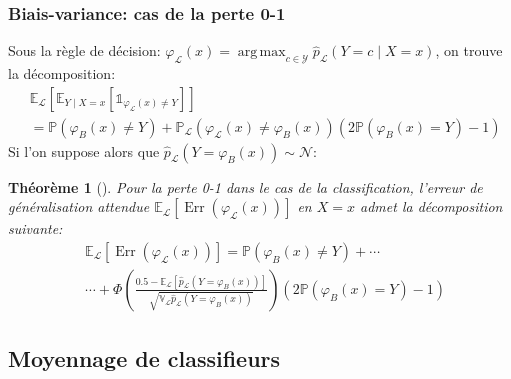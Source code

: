 \documentclass[dvipsnames,10pt]{beamer}
\DeclareMathOperator*{\argmax}{arg\,max}
\theoremstyle{plain}
\newtheorem{theoreme}{Théorème}
\theoremstyle{definition}
\begin{document}
\begin{frame}
\frametitle{Biais-variance: cas de la perte 0-1}
Sous la règle de décision: $\varphi_{\mathcal{L}} (x) = \argmax_{c \in \mathcal{Y}} \hat{p}_\mathcal{L} ( Y = c \mid X = x )$, on trouve la décomposition:
\begin{align*}
    &\mathbb{E}_{\mathcal{L}} \left[ \mathbb{E}_{Y \mid X = x} \left[ \mathds{1}_{\varphi_{\mathcal{L}} (x) \neq Y } \right]  \right] \\
    &= \mathbb{P} \left( \varphi_B (x) \neq Y \right) + \mathbb{P}_{\mathcal{L}} \left( \varphi_{\mathcal{L}} (x) \neq \varphi_B (x) \right) \left( 2 \mathbb{P} \left( \varphi_B (x) = Y \right) - 1 \right)
\end{align*}
Si l'on suppose alors que $\hat{p}_{\mathcal{L}} (Y = \varphi_B (x)) \sim \mathcal{N}$:\begin{theoreme}[\cite{Louppe2014}]
Pour la perte 0-1 dans le cas de la classification, l'erreur de généralisation attendue $\mathbb{E}_{\mathcal{L}} \left[ \operatorname{Err} ( \varphi_{\mathcal{L}} (x) ) \right]$ en $ X = x $ admet la décomposition suivante:
\begin{align*}
    &\mathbb{E}_{\mathcal{L}} \left[ \operatorname{Err} ( \varphi_{\mathcal{L}} (x) ) \right] = \mathbb{P} ( \varphi_B (x) \neq Y ) + \dotsb \\
    &\dotsb + \Phi \left( \frac{0.5 - \mathbb{E}_{\mathcal{L}} [ \hat{p}_{\mathcal{L}} (Y = \varphi_B (x)) ] }{\sqrt{\mathbb{V}_{\mathcal{L}} \hat{p}_{\mathcal{L}} (Y = \varphi_B (x)) } } \right) \left( 2 \mathbb{P} ( \varphi_B (x) = Y ) - 1 \right)
\end{align*}
\end{theoreme}
\end{frame}

\subsection{Moyennage de classifieurs}
\end{document}
